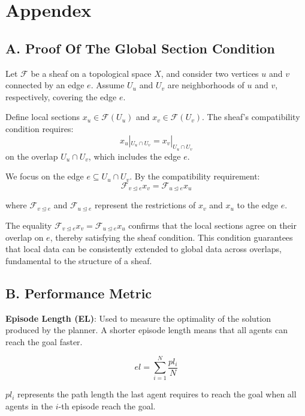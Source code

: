 \documentclass[conference]{IEEEtran}
\begin{document}
\appendices
\section*{Appendex}
\renewcommand{\thesection}{\Alph{section}}
\subsection*{A. Proof Of The Global Section Condition}

Let $\mathcal{F}$ be a sheaf on a topological space $X$, and consider two vertices $u$ and $v$ connected by an edge $e$. Assume $U_u$ and $U_v$ are neighborhoods of $u$ and $v$, respectively, covering the edge $e$.

Define local sections $x_u \in \mathcal{F}(U_u)$ and $x_v \in \mathcal{F}(U_v)$. The sheaf's compatibility condition requires:
\begin{equation}
    x_u|_{U_u \cap U_v} = x_v|_{U_u \cap U_v}
\end{equation}
on the overlap $U_u \cap U_v$, which includes the edge $e$.

We focus on the edge $e \subseteq U_u \cap U_v$. By the compatibility requirement:
\begin{equation}
    \mathcal{F}_{v \unlhd e} x_v = \mathcal{F}_{u \unlhd e} x_u
\end{equation} 

where $\mathcal{F}_{v \unlhd e}$ and $\mathcal{F}_{u \unlhd e}$ represent the restrictions of $x_v$ and $x_u$ to the edge $e$.

The equality $\mathcal{F}_{v \unlhd e} x_v = \mathcal{F}_{u \unlhd e} x_u$ confirms that the local sections agree on their overlap on $e$, thereby satisfying the sheaf condition. This condition guarantees that local data can be consistently extended to global data across overlaps, fundamental to the structure of a sheaf.

\subsection*{B. Performance Metric}
\textbf{Episode Length (EL)}: Used to measure the optimality of the solution produced by the planner. A shorter episode length means that all agents can reach the goal faster.

$$
e l=\sum_{i=1}^N \frac{p l_i}{N}
$$

$p l_i$ represents the path length the last agent requires to reach the goal when all agents in the $i$-th episode reach the goal.
\end{document}
